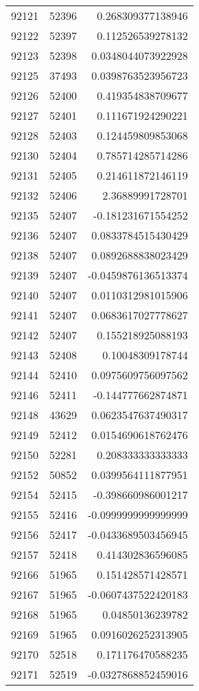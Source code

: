 \begin{tabular}{r | r | r}
92121 & 52396 & 0.268309377138946 \\
92122 & 52397 & 0.112526539278132 \\
92123 & 52398 & 0.0348044073922928 \\
92125 & 37493 & 0.0398763523956723 \\
92126 & 52400 & 0.419354838709677 \\
92127 & 52401 & 0.111671924290221 \\
92128 & 52403 & 0.124459809853068 \\
92130 & 52404 & 0.785714285714286 \\
92131 & 52405 & 0.214611872146119 \\
92132 & 52406 & 2.36889991728701 \\
92135 & 52407 & -0.181231671554252 \\
92136 & 52407 & 0.0833784515430429 \\
92138 & 52407 & 0.0892688838023429 \\
92139 & 52407 & -0.0459876136513374 \\
92140 & 52407 & 0.0110312981015906 \\
92141 & 52407 & 0.0683617027778627 \\
92142 & 52407 & 0.155218925088193 \\
92143 & 52408 & 0.10048309178744 \\
92144 & 52410 & 0.0975609756097562 \\
92146 & 52411 & -0.144777662874871 \\
92148 & 43629 & 0.0623547637490317 \\
92149 & 52412 & 0.0154690618762476 \\
92150 & 52281 & 0.208333333333333 \\
92152 & 50852 & 0.0399564111877951 \\
92154 & 52415 & -0.398660986001217 \\
92155 & 52416 & -0.0999999999999999 \\
92156 & 52417 & -0.0433689503456945 \\
92157 & 52418 & 0.414302836596085 \\
92166 & 51965 & 0.151428571428571 \\
92167 & 51965 & -0.0607437522420183 \\
92168 & 51965 & 0.04850136239782 \\
92169 & 51965 & 0.0916026252313905 \\
92170 & 52518 & 0.171176470588235 \\
92171 & 52519 & -0.0327868852459016 \\

\end{tabular}
